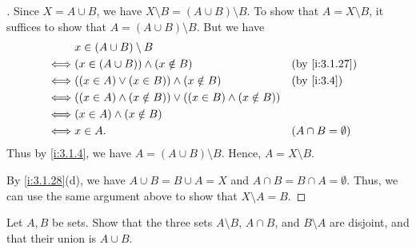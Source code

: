 \begin{proof}[]
  Since \(X = A \cup B\), we have \(X \setminus B = (A \cup B) \setminus B\).
  To show that \(A = X \setminus B\), it suffices to show that \(A = (A \cup B) \setminus B\).
  But we have
  \begin{align*}
         & x \in (A \cup B) \setminus B                                                                   \\
    \iff & (x \in (A \cup B)) \land (x \notin B)                              &  & \by{i:3.1.27}          \\
    \iff & ((x \in A) \lor (x \in B)) \land (x \notin B)                      &  & \by{i:3.4}             \\
    \iff & ((x \in A) \land (x \notin B)) \lor ((x \in B) \land (x \notin B))                             \\
    \iff & (x \in A) \land (x \notin B)                                                                   \\
    \iff & x \in A.                                                           &  & (A \cap B = \emptyset)
  \end{align*}
  Thus by \cref{i:3.1.4}, we have \(A = (A \cup B) \setminus B\).
  Hence, \(A = X \setminus B\).

  By \cref{i:3.1.28}(d), we have \(A \cup B = B \cup A = X\) and \(A \cap B = B \cap A = \emptyset\).
  Thus, we can use the same argument above to show that \(X \setminus A = B\).
\end{proof}

\begin{ex}\label{i:ex:3.1.10}
  Let \(A, B\) be sets.
  Show that the three sets \(A \setminus B\), \(A \cap B\), and \(B \setminus A\) are disjoint, and that their union is \(A \cup B\).
\end{ex}

